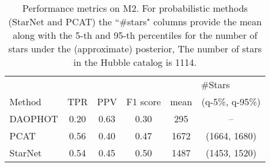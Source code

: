 
\begin{table}[!tb]
\centering
\caption{Performance metrics on M2.
For probabilistic methods (StarNet and PCAT)
the ``\#stars" columns provide the mean along with the 5-th and 95-th percentiles
for the number of stars under the (approximate) posterior,
The number of stars in the Hubble catalog is 1114. }
\label{tab:summary_stats}
\begin{tabular}{l|ccc|cc}
\toprule
& & & & \multicolumn{2}{c}{\#Stars} \\
     Method &   TPR &   PPV &  F1 score &  mean & (q-5\%, q-95\%)\\
\midrule
    DAOPHOT &  0.20 &  0.63 &      0.30 &     295 & -- \\
       PCAT &  0.56 &  0.40 &      0.47 &    1672 & (1664, 1680)\\
 StarNet &  0.54 &  0.45 &      0.50 &    1487 & (1453, 1520)\\
\bottomrule
\end{tabular}
\end{table}
